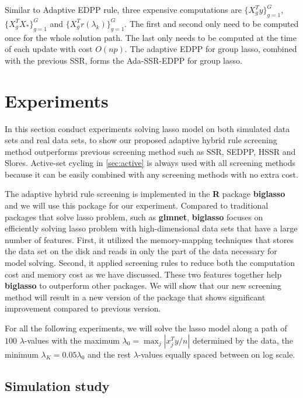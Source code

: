 Similar to Adaptive EDPP rule, three expensive computations are $\{X_g^Ty\}_{g=1}^G$, $\{X_g^TX_*\}_{g=1}^G$ and $\{X_g^Tr(\lambda_k)\}_{g=1}^G$. The first and second only need to be computed once for the whole solution path. The last only needs to be computed at the time of each update with cost $O(np)$. The adaptive EDPP for group lasso, combined with the previous SSR, forms the Ada-SSR-EDPP for group lasso.

\section{Experiments}
\label{sec:experiments}

In this section conduct experiments solving lasso model on both simulated data sets and real data sets, to show our proposed adaptive hybrid rule screening method outperforms previous screening method such as SSR, SEDPP, HSSR and Slores. Active-set cycling in \ref{sec:active} is always used with all screening methods because it can be easily combined with any screening methods with no extra cost.

The adaptive hybrid rule screening is implemented in the \textbf{R} package \textbf{biglasso} and we will use this package for our experiment. Compared to traditional packages that solve lasso problem, such as \textbf{glmnet}, \textbf{biglasso} focuses on efficiently solving lasso problem with high-dimensional data sets that have a large number of features. First, it utilized the memory-mapping techniques that stores the data set on the disk and reads in only the part of the data necessary for model solving. Second, it applied screening rules to reduce both the computation cost and memory cost as we have discussed. These two features together help \textbf{biglasso} to outperform other packages. We will show that our new screening method will result in a new version of the package that shows significant improvement compared to previous version. 

For all the following experiments, we will solve the lasso model along a path of $100$ $\lambda$-values with the maximum $\lambda_0=\max_j|x_j^Ty/n|$ determined by the data, the minimum $\lambda_K=0.05\lambda_0$ and the rest $\lambda$-values equally spaced between on log scale.

\subsection{Simulation study}
\label{sec:sim}

